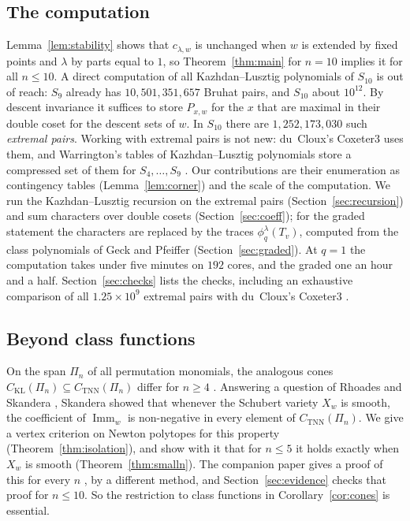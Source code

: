 \documentclass[11pt]{amsart}
\theoremstyle{definition}
\theoremstyle{remark}
\newcommand{\Imm}{\operatorname{Imm}}
\newcommand{\CKL}{C_{\mathrm{KL}}}
\newcommand{\CTNN}{C_{\mathrm{TNN}}}
\begin{document}
\subsection*{The computation}
Lemma~\ref{lem:stability} shows that $c_{\lambda,w}$ is unchanged when $w$ is extended by fixed points and $\lambda$ by parts equal to $1$, so Theorem~\ref{thm:main} for $n=10$ implies it for all $n\le10$. A direct computation of all Kazhdan--Lusztig polynomials of $S_{10}$ is out of reach: $S_9$ already has $10{,}501{,}351{,}657$ Bruhat pairs, and $S_{10}$ about $10^{12}$. By descent invariance it suffices to store $P_{x,w}$ for the $x$ that are maximal in their double coset for the descent sets of $w$. In $S_{10}$ there are $1{,}252{,}173{,}030$ such \emph{extremal pairs}. Working with extremal pairs is not new: du~Cloux's \textsf{Coxeter3} \cite{Cox3} uses them, and Warrington's tables of Kazhdan--Lusztig polynomials store a compressed set of them for $S_4,\dots,S_9$ \cite{War}. Our contributions are their enumeration as contingency tables (Lemma~\ref{lem:corner}) and the scale of the computation. We run the Kazhdan--Lusztig recursion on the extremal pairs (Section~\ref{sec:recursion}) and sum characters over double cosets (Section~\ref{sec:coeff}); for the graded statement the characters are replaced by the traces $\phi^\lambda_q(T_v)$, computed from the class polynomials of Geck and Pfeiffer \cite{GP} (Section~\ref{sec:graded}). At $q=1$ the computation takes under five minutes on $192$ cores, and the graded one an hour and a half. Section~\ref{sec:checks} lists the checks, including an exhaustive comparison of all $1.25\times10^9$ extremal pairs with du~Cloux's \textsf{Coxeter3} \cite{Cox3}.

\subsection*{Beyond class functions}
On the span $\Pi_n$ of all permutation monomials, the analogous cones $\CKL(\Pi_n)\subseteq\CTNN(\Pi_n)$ differ for $n\ge4$ \cite{RS06,Ska08}. Answering a question of Rhoades and Skandera \cite{RS06}, Skandera \cite{Ska08} showed that whenever the Schubert variety $X_w$ is smooth, the coefficient of $\Imm_w$ is non-negative in every element of $\CTNN(\Pi_n)$. We give a vertex criterion on Newton polytopes for this property (Theorem~\ref{thm:isolation}), and show with it that for $n\le5$ it holds exactly when $X_w$ is smooth (Theorem~\ref{thm:smalln}). The companion paper gives a proof of this for every $n$ \cite[Thm.~9.6]{McN}, by a different method, and Section~\ref{sec:evidence} checks that proof for $n\le10$. So the restriction to class functions in Corollary~\ref{cor:cones} is essential.
\end{document}
